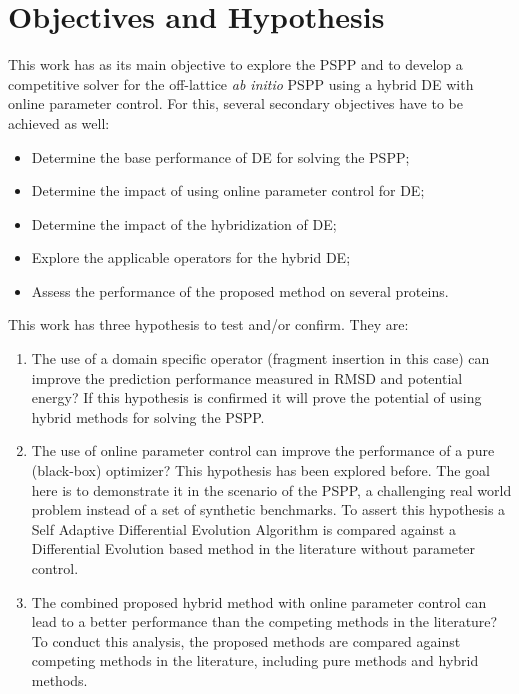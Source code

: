 \section{Objectives and Hypothesis}\label{sec:chap1_objectives}


This work has as its main objective to explore the \ac{PSPP} and to develop a
competitive solver for the off-lattice \textit{ab initio} \ac{PSPP} using a hybrid
\ac{DE} with online parameter control. For this, several secondary objectives have to be achieved as well:

\begin{itemize}
    \item Determine the base performance of \ac{DE} for solving the \ac{PSPP};
    \item Determine the impact of using online parameter control for \ac{DE};
    \item Determine the impact of the hybridization of \ac{DE};
    \item Explore the applicable operators for the hybrid \ac{DE};
    \item Assess the performance of the proposed method on several proteins.
\end{itemize}

This work has three hypothesis to test and/or confirm. They are:
\begin{enumerate}
    \item The use of a domain specific operator (fragment insertion in this case) can improve the prediction performance measured in RMSD and potential energy? If this hypothesis is confirmed it will prove the potential of using hybrid methods for solving the \ac{PSPP}.
    \item The use of online parameter control can improve the performance of a pure (black-box) optimizer? This hypothesis has been explored before. The goal here is to demonstrate it in the scenario of the \ac{PSPP}, a challenging real world problem instead of a set of synthetic benchmarks. To assert this hypothesis a Self Adaptive Differential Evolution Algorithm is compared against a Differential Evolution based method in the literature without parameter control.
    \item The combined proposed hybrid method with online parameter control can lead to a better performance than the competing methods in the literature? To conduct this analysis, the proposed methods are compared against competing methods in the literature, including pure methods and hybrid methods.
\end{enumerate}

